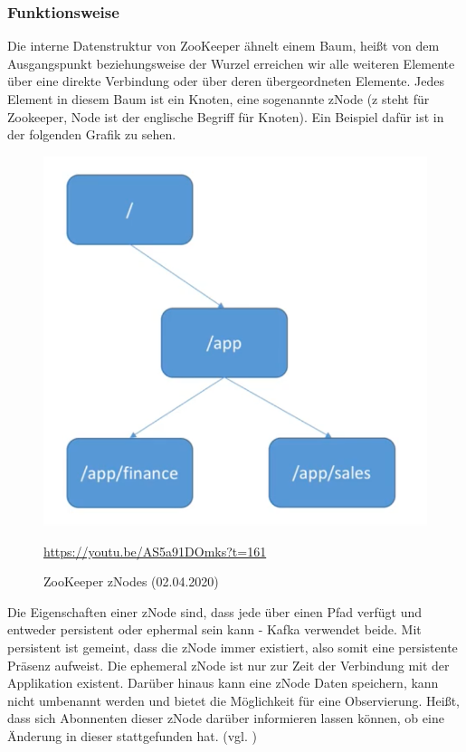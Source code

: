 \subsubsection{Funktionsweise}
Die interne Datenstruktur von ZooKeeper ähnelt einem Baum, heißt von dem Ausgangspunkt beziehungsweise der Wurzel erreichen wir alle weiteren Elemente über eine direkte Verbindung oder über deren übergeordneten Elemente. Jedes Element in diesem Baum ist ein Knoten, eine sogenannte zNode (z steht für Zookeeper, Node ist der englische Begriff für Knoten). Ein Beispiel dafür ist in der folgenden Grafik zu sehen.
\begin{figure}[H]
    \centering
    \includegraphics[scale=0.3]{images/zookeeper-node.png}
    \caption{ZooKeeper zNodes (02.04.2020)}
    \url{https://youtu.be/AS5a91DOmks?t=161}
    \label{img:}
\end{figure}
Die Eigenschaften einer zNode sind, dass jede über einen Pfad verfügt und entweder persistent oder ephermal sein kann - Kafka verwendet beide. Mit persistent ist gemeint, dass die zNode immer existiert, also somit eine persistente Präsenz aufweist. Die ephemeral zNode ist nur zur Zeit der Verbindung mit der Applikation existent. Darüber hinaus kann eine zNode Daten speichern, kann nicht umbenannt werden und bietet die Möglichkeit für eine Observierung. Heißt, dass sich Abonnenten dieser zNode darüber informieren lassen können, ob eine Änderung in dieser stattgefunden hat.
(vgl. \cite{ZooKeeper-Video})
